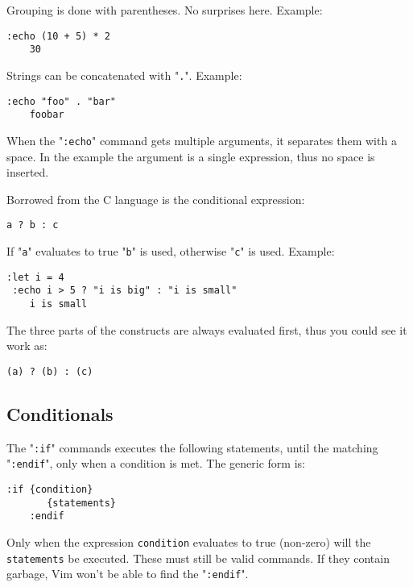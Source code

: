 Grouping is done with parentheses.
No surprises here.
Example:

\begin{Verbatim}[samepage=true]
 :echo (10 + 5) * 2
    30
\end{Verbatim}

Strings can be concatenated with "\texttt{.}".
Example:

\begin{Verbatim}[samepage=true]
 :echo "foo" . "bar"
    foobar
\end{Verbatim}

When the "\texttt{:echo}" command gets multiple arguments, it separates them with a space.
In the example the argument is a single expression, thus no space is inserted.

Borrowed from the C language is the conditional expression:

\begin{Verbatim}[samepage=true]
    a ? b : c
\end{Verbatim}

If "\texttt{a}" evaluates to true "\texttt{b}" is used, otherwise "\texttt{c}" is used.
Example:

\begin{Verbatim}[samepage=true]
 :let i = 4
 :echo i > 5 ? "i is big" : "i is small"
    i is small
\end{Verbatim}

The three parts of the constructs are always evaluated first, thus you could see it work as:

\begin{Verbatim}[samepage=true]
    (a) ? (b) : (c)
\end{Verbatim}
\subsection{Conditionals}
The "\texttt{:if}" commands executes the following statements, until the matching "\texttt{:endif}", only when a condition is met.
The generic form is:

\begin{Verbatim}[samepage=true]
    :if {condition}
       {statements}
    :endif
\end{Verbatim}

Only when the expression \texttt{{condition}} evaluates to true (non-zero) will the \texttt{{statements}} be executed.
These must still be valid commands.
If they contain garbage, Vim won't be able to find the "\texttt{:endif}".

